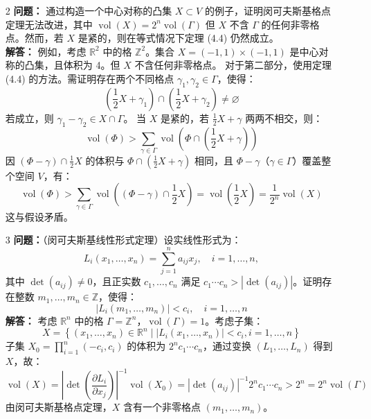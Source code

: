 \documentclass[UTF8]{ctexart}
\begin{document}
\begin{enumerate}
\begin{enumerate}
\item[2] 
\textbf{问题：} 通过构造一个中心对称的凸集 \(X \subset V\) 的例子，证明闵可夫斯基格点定理无法改进，其中 \(\operatorname{vol}(X) = 2^n \operatorname{vol}(\Gamma)\) 但 \(X\) 不含 \(\Gamma\) 的任何非零格点。然而，若 \(X\) 是紧的，则在等式情况下定理 (4.4) 仍然成立。\\
\textbf{解答：} 例如，考虑 \(\mathbb{R}^2\) 中的格 \(\mathbb{Z}^2\)。集合 \(X = (-1, 1) \times (-1, 1)\) 是中心对称的凸集，且体积为 4。但 \(X\) 不含任何非零格点。  
对于第二部分，使用定理 (4.4) 的方法。需证明存在两个不同格点 \(\gamma_1, \gamma_2 \in \Gamma\)，使得：
\[
\left(\frac{1}{2} X + \gamma_1\right) \cap \left(\frac{1}{2} X + \gamma_2\right) \neq \varnothing
\]
若成立，则 \(\gamma_1 - \gamma_2 \in X \cap \Gamma\)。  
当 \(X\) 是紧的，若 \(\frac{1}{2} X + \gamma\) 两两不相交，则：
\[
\operatorname{vol}(\Phi) > \sum_{\gamma \in \Gamma} \operatorname{vol}\left(\Phi \cap \left(\frac{1}{2} X + \gamma\right)\right)
\]
因 \((\Phi - \gamma) \cap \frac{1}{2} X\) 的体积与 \(\Phi \cap \left(\frac{1}{2} X + \gamma\right)\) 相同，且 \(\Phi - \gamma\)（\(\gamma \in \Gamma\)）覆盖整个空间 \(V\)，有：
\[
\operatorname{vol}(\Phi) > \sum_{\gamma \in \Gamma} \operatorname{vol}\left((\Phi - \gamma) \cap \frac{1}{2} X\right) = \operatorname{vol}\left(\frac{1}{2} X\right) = \frac{1}{2^n} \operatorname{vol}(X)
\]
这与假设矛盾。

\item[3] 
\textbf{问题：}（闵可夫斯基线性形式定理）设实线性形式为：
\[
L_i(x_1, \dots, x_n) = \sum_{j=1}^n a_{ij} x_j, \quad i = 1, \dots, n,
\]
其中 \(\operatorname{det}(a_{ij}) \neq 0\)，且正实数 \(c_1, \dots, c_n\) 满足 \(c_1 \cdots c_n > |\operatorname{det}(a_{ij})|\)。证明存在整数 \(m_1, \dots, m_n \in \mathbb{Z}\)，使得：
\[
|L_i(m_1, \dots, m_n)| < c_i, \quad i = 1, \dots, n
\]
\textbf{解答：} 考虑 \(\mathbb{R}^n\) 中的格 \(\Gamma = \mathbb{Z}^n\)，\(\operatorname{vol}(\Gamma) = 1\)。考虑子集：
\[
X = \left\{(x_1, \dots, x_n) \in \mathbb{R}^n \mid |L_i(x_1, \dots, x_n)| < c_i, i = 1, \dots, n\right\}
\]
子集 \(X_0 = \prod_{i=1}^n (-c_i, c_i)\) 的体积为 \(2^n c_1 \cdots c_n\)，通过变换 \((L_1, \dots, L_n)\) 得到 \(X\)，故：
\[
\operatorname{vol}(X) = |\operatorname{det}(\frac{\partial L_i}{\partial x_j})|^{-1} \operatorname{vol}(X_0) = |\operatorname{det}(a_{ij})|^{-1} 2^n c_1 \cdots c_n > 2^n = 2^n \operatorname{vol}(\Gamma)
\]
由闵可夫斯基格点定理，\(X\) 含有一个非零格点 \((m_1, \dots, m_n)\)。

\end{enumerate}


\end{enumerate}
\end{document}
